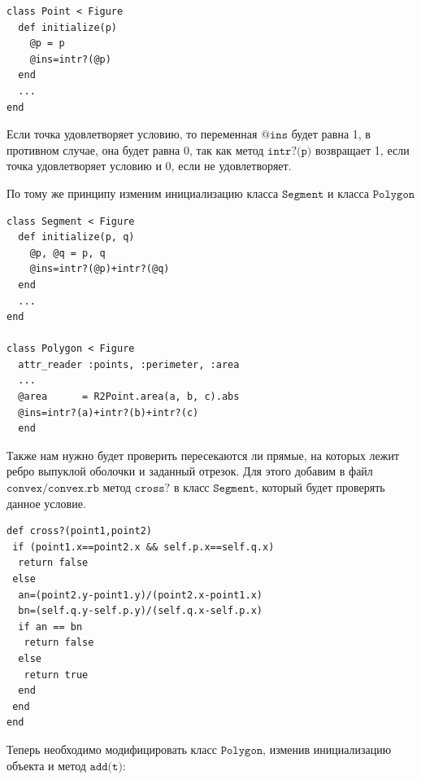 \begin{small}
\begin{verbatim}
class Point < Figure
  def initialize(p) 
    @p = p
    @ins=intr?(@p) 
  end
  ...
end
\end{verbatim}
\end{small}

Если точка удовлетворяет условию, то переменная $\texttt{@ins}$ будет равна 1, в противном случае, она будет равна 0, так как метод $\texttt{intr?(p)}$ возвращает 1, если точка удовлетворяет условию и 0, если не удовлетворяет.

По тому же принципу изменим инициализацию класса $\texttt{Segment}$ и класса $\texttt{Polygon}$

\begin{small}
\begin{verbatim}
class Segment < Figure
  def initialize(p, q) 
    @p, @q = p, q
    @ins=intr?(@p)+intr?(@q)
  end
  ...
end

class Polygon < Figure
  attr_reader :points, :perimeter, :area 
  ...
  @area      = R2Point.area(a, b, c).abs
  @ins=intr?(a)+intr?(b)+intr?(c)
  end
\end{verbatim}
\end{small}




Также нам нужно будет проверить пересекаются ли прямые, на которых лежит ребро выпуклой оболочки и 
заданный отрезок. Для этого добавим в файл $\texttt{convex/convex.rb}$ метод $\texttt{cross?}$ в класс 
$\texttt{Segment}$, который будет проверять данное условие.

\begin{small}
\begin{verbatim}
def cross?(point1,point2)
 if (point1.x==point2.x && self.p.x==self.q.x)
  return false
 else
  an=(point2.y-point1.y)/(point2.x-point1.x)
  bn=(self.q.y-self.p.y)/(self.q.x-self.p.x)
  if an == bn
   return false
  else
   return true
  end
 end
end
\end{verbatim}
\end{small}

Теперь необходимо модифицировать класс $\texttt{Polygon}$, изменив инициализацию объекта и метод $\texttt{add(t)}$:
 
